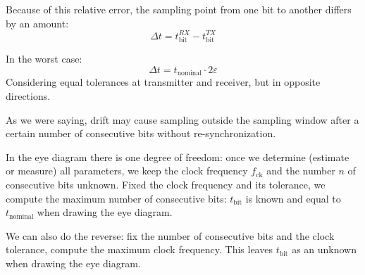 \documentclass[a4paper,11pt]{article}
\begin{document}
\begin{itemize}
	      Because of this relative error, the sampling point from one bit to another differs by an amount:
	      $$
		      \Delta t = t_\text{bit}^{RX} - t_\text{bit}^{TX}
	      $$

	      In the worst case:
	      $$
		      \Delta t = t_\text{nominal} \cdot 2 \varepsilon
	      $$
	      Considering equal tolerances at transmitter and receiver, but in opposite directions.

	      As we were saying, drift may cause sampling outside the sampling window after a certain number of consecutive bits without re-synchronization.

\end{itemize}

\par\smallskip

In the eye diagram there is one degree of freedom: once we determine (estimate or measure) all parameters, we keep the clock frequency $f_\text{ck}$ and the number $n$ of consecutive bits unknown.
Fixed the clock frequency and its tolerance, we compute the maximum number of consecutive bits: $t_\text{bit}$ is known and equal to $t_\text{nominal}$ when drawing the eye diagram.

We can also do the reverse: fix the number of consecutive bits and the clock tolerance, compute the maximum clock frequency.
This leaves $t_\text{bit}$ as an unknown when drawing the eye diagram.
\end{document}
